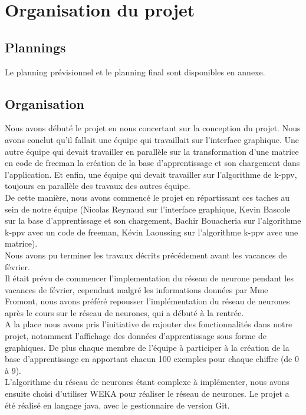 \documentclass[10pt,a4paper]{report}
\begin{document}

\section{Organisation du projet}

\subsection{Plannings}
\begin{flushleft}
Le planning prévisionnel et le planning final sont disponibles en annexe.
\end{flushleft}

\subsection{Organisation}

\begin{flushleft}
Nous avons débuté le projet en nous concertant sur la conception du projet. Nous avons conclut qu'il fallait une équipe qui travaillait sur l'interface graphique. Une autre équipe qui devait travailler en parallèle sur la transformation d'une matrice en code de freeman la création de la base d'apprentissage et son chargement dans l'application. Et enfin, une équipe qui devait travailler sur l'algorithme de k-ppv, toujours en parallèle des travaux des autres équipe.\\
De cette manière, nous avons commencé le projet en répartissant ces taches au sein de notre équipe (Nicolas Reynaud sur l'interface graphique, Kevin Bascole sur la base d'apprentissage et son chargement, Bachir Bouacheria sur l'algorithme k-ppv avec un code de freeman, Kévin Laoussing sur l'algorithme k-ppv avec une matrice).\\
Nous avons pu terminer les travaux décrits précédement avant les vacances de février.\\ 
Il était prévu de commencer l'implementation du réseau de neurone pendant les vacances de février, cependant malgré les informations données par Mme Fromont, nous avons préféré repousser l'implémentation du réseau de neurones après le cours sur le réseau de neurones, qui a débuté à la rentrée.\\
A la place nous avons pris l'initiative de rajouter des fonctionnalités dans notre projet, notamment l'affichage des données d'apprentissage sous forme de graphiques. De plus chaque membre de l'équipe à participer à la création de la base d'apprentissage en apportant chacun 100 exemples pour chaque chiffre (de 0 à 9).\\
L'algorithme du réseau de neurones étant complexe à implémenter,
nous avons ensuite choisi d'utiliser WEKA pour réaliser le réseau de neurones.
Le projet a été réalisé en langage java, avec le gestionnaire de version Git.
\end{flushleft}
\end{document}
